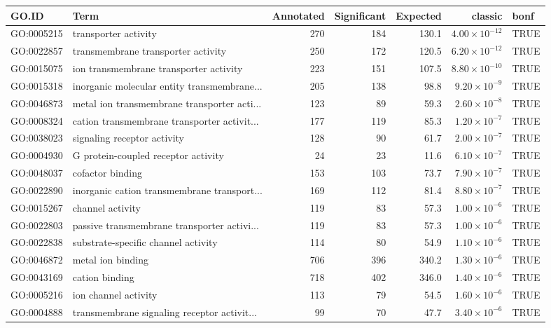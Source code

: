 \begin{table}[ht]
\centering
\begin{tabular}{llrrrrl}
  \hline
GO.ID & Term & Annotated & Significant & Expected & classic & bonf \\ 
  \hline
GO:0005215 & transporter activity & 270 & 184 & 130.1 & $4.00 \times 10^{-12}$ & TRUE \\ 
  GO:0022857 & transmembrane transporter activity & 250 & 172 & 120.5 & $6.20 \times 10^{-12}$ & TRUE \\ 
  GO:0015075 & ion transmembrane transporter activity & 223 & 151 & 107.5 & $8.80 \times 10^{-10}$ & TRUE \\ 
  GO:0015318 & inorganic molecular entity transmembrane... & 205 & 138 & 98.8 & $9.20 \times 10^{-9}$ & TRUE \\ 
  GO:0046873 & metal ion transmembrane transporter acti... & 123 & 89 & 59.3 & $2.60 \times 10^{-8}$ & TRUE \\ 
  GO:0008324 & cation transmembrane transporter activit... & 177 & 119 & 85.3 & $1.20 \times 10^{-7}$ & TRUE \\ 
  GO:0038023 & signaling receptor activity & 128 & 90 & 61.7 & $2.00 \times 10^{-7}$ & TRUE \\ 
  GO:0004930 & G protein-coupled receptor activity & 24 & 23 & 11.6 & $6.10 \times 10^{-7}$ & TRUE \\ 
  GO:0048037 & cofactor binding & 153 & 103 & 73.7 & $7.90 \times 10^{-7}$ & TRUE \\ 
  GO:0022890 & inorganic cation transmembrane transport... & 169 & 112 & 81.4 & $8.80 \times 10^{-7}$ & TRUE \\ 
  GO:0015267 & channel activity & 119 & 83 & 57.3 & $1.00 \times 10^{-6}$ & TRUE \\ 
  GO:0022803 & passive transmembrane transporter activi... & 119 & 83 & 57.3 & $1.00 \times 10^{-6}$ & TRUE \\ 
  GO:0022838 & substrate-specific channel activity & 114 & 80 & 54.9 & $1.10 \times 10^{-6}$ & TRUE \\ 
  GO:0046872 & metal ion binding & 706 & 396 & 340.2 & $1.30 \times 10^{-6}$ & TRUE \\ 
  GO:0043169 & cation binding & 718 & 402 & 346.0 & $1.40 \times 10^{-6}$ & TRUE \\ 
  GO:0005216 & ion channel activity & 113 & 79 & 54.5 & $1.60 \times 10^{-6}$ & TRUE \\ 
  GO:0004888 & transmembrane signaling receptor activit... & 99 & 70 & 47.7 & $3.40 \times 10^{-6}$ & TRUE \\ 

\end{tabular}
\end{table}
